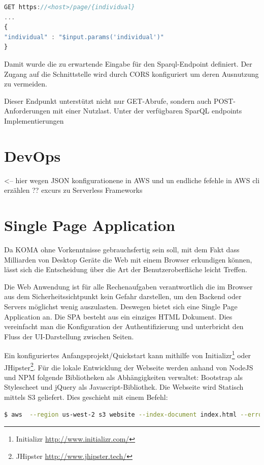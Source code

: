\documentclass[
12pt,
english,
ngerman,
headsepline,
twoside,
openright,
numbers=noenddot,version=first
]{scrreprt}
\begin{document}
\begin{lstlisting}[language=Javascript,caption={Mapping Template},label={lst:map-template}]
GET https://<host>/page/{individual} 
...
{
"individual" : "$input.params('individual')"
}
\end{lstlisting}

Damit wurde die zu erwartende Eingabe für den Sparql-Endpoint definiert. Der Zugang auf die Schnittstelle wird durch CORS konfiguriert um deren Ausnutzung zu vermeiden. 

Dieser Endpunkt unterstützt nicht nur GET-Abrufe, sondern auch POST-Anforderungen mit einer Nutzlast.
Unter der verfügbaren SparQL endpoints Implementierungen




\section{DevOps}
<-- hier wegen JSON konfigurationene in AWS und un endliche fefehle in AWS cli erzählen ?? 
excurs zu Serverless Frameworks 

\section{Single Page Application}

Da KOMA ohne Vorkenntnisse gebrauchsfertig sein soll, mit dem Fakt dass Milliarden von Desktop Geräte die Web mit einem Browser erkundigen können, lässt sich die Entscheidung über die Art der Benutzeroberfläche leicht Treffen.

Die Web Anwendung ist für alle Rechenaufgaben verantwortlich die im Browser aus dem Sicherheitssichtpunkt kein Gefahr darstellen, um den Backend oder Servers möglichst wenig auszulasten. Deswegen bietet sich eine Single Page Application an. 
Die SPA besteht aus ein einziges HTML Dokument. Dies vereinfacht man die Konfiguration der Authentifizierung und unterbricht den Fluss der UI-Darstellung zwischen Seiten.

Ein konfiguriertes Anfangsprojekt/Quickstart kann mithilfe von Initializr\footnote{Initializr \url{http://www.initializr.com/}} oder JHipster\footnote{JHipster \url{http://www.jhipster.tech/}}. Für die lokale Entwicklung der Webseite werden anhand von NodeJS und NPM folgende Bibliotheken als Abhängigkeiten verwaltet: Bootstrap als Stylescheet und jQuery als Javascript-Bibliothek.
Die Webseite wird Statisch mittels S3 geliefert. Dies geschieht mit einem Befehl: 
\begin{lstlisting}[language=BASH, caption={Webseite veröffentlichen}]
$ aws  --region us-west-2 s3 website --index-document index.html --error-document error.html 's3://koma.thb.de'
\end{lstlisting} 
\end{document}
